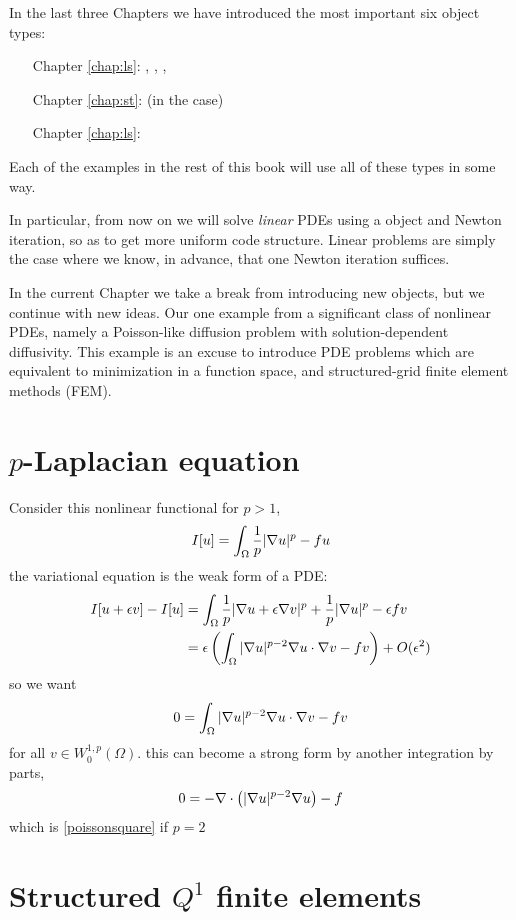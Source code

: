 
In the last three Chapters we have introduced the most important six \PETSc object types:
\begin{itemize}
\item[\quad Chapter \ref{chap:ls}:] \pVec, \pMat, \pKSP, \pPC
\item[\quad Chapter \ref{chap:st}:] \pDM (in the \pDMDA case)
\item[\quad Chapter \ref{chap:ls}:] \pSNES
\end{itemize}
Each of the examples in the rest of this book will use all of these types in some way.

In particular, from now on we will solve \emph{linear} PDEs using a \pSNES object and Newton iteration, so as to get more uniform code structure.  Linear problems are simply the case where we know, in advance, that one Newton iteration suffices.

In the current Chapter we take a break from introducing new \PETSc objects, but we continue with new ideas.  Our one example from a significant class of nonlinear PDEs, namely a Poisson-like diffusion problem with solution-dependent diffusivity.  This example is an excuse to introduce PDE problems which are equivalent to minimization in a function space, and structured-grid finite element methods (FEM).


\section{$p$-Laplacian equation}

Consider this nonlinear functional for $p>1$,
    $$I[u] = \int_\Omega \frac{1}{p} |\nabla u|^p - fu$$
the variational equation is the weak form of a PDE:
\begin{align*}
I[u+\epsilon v] - I[u] &= \int_\Omega \frac{1}{p} |\nabla u + \epsilon \nabla v|^p + \frac{1}{p} |\nabla u|^p - \epsilon f v \\
   &= \epsilon \left(\int_\Omega |\nabla u|^{p-2} \nabla u \cdot \nabla v - f v\right) + O(\epsilon^2)
\end{align*}
so we want
    $$0 = \int_\Omega |\nabla u|^{p-2} \nabla u \cdot \nabla v - f v$$
for all $v \in W^{1,p}_0(\Omega)$.  this can become a strong form by another integration by parts,
    $$0 = - \nabla\cdot\left(|\nabla u|^{p-2} \nabla u\right) - f$$
which is \eqref{poissonsquare} if $p=2$

\section{Structured $Q^1$ finite elements}

